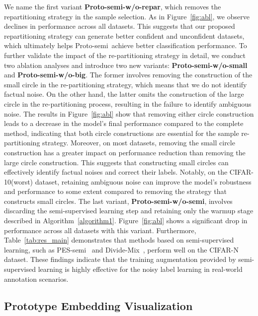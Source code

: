 \documentclass[letterpaper]{article} %
\newcommand{\method}{Proto-semi}
\begin{document}
We name the first variant \textbf{\method-w/o-repar}, which removes the repartitioning strategy in the sample selection. As in Figure~\ref{fig:abl}, we observe declines in performance across all datasets. This suggests that our proposed repartitioning strategy can generate better confident and unconfident datasets, which ultimately helps \method\ achieve better classification performance. To further validate the impact of the re-partitioning strategy in detail, we conduct two ablation analyses and introduce two new variants: \textbf{\method-w/o-small} and \textbf{\method-w/o-big}. The former involves removing the construction of the small circle in the re-partitioning strategy, which means that we do not identify factual noise. On the other hand, the latter omits the construction of the large circle in the re-partitioning process, resulting in the failure to identify ambiguous noise.
The results in Figure~\ref{fig:abl} show that removing either circle construction leads to a decrease in the model's final performance compared to the complete method, indicating that both circle constructions are essential for the sample re-partitioning strategy. Moreover, on most datasets, removing the small circle construction has a greater impact on performance reduction than removing the large circle construction. This suggests that constructing small circles can effectively identify factual noises and correct their labels. Notably, on the CIFAR-10(worst) dataset, retaining ambiguous noise can improve the model's robustness and performance to some extent compared to removing the strategy that constructs small circles. The last variant, \textbf{\method-w/o-semi}, involves discarding the semi-supervised learning step and retaining only the warmup stage described in Algorithm~\ref{algorithm1}. 
Figure~\ref{fig:abl} shows a significant drop in performance across all datasets with this variant.
Furthermore, Table~\ref{tab:res_main} demonstrates that methods based on semi-supervised learning, such as PES-semi~\cite{DBLP:conf/nips/BaiYHYLMNL21} and Divide-Mix~\cite{DBLP:conf/iclr/LiSH20}, perform well on the CIFAR-N dataset.
These findings indicate that the training augmentation provided by semi-supervised learning is highly effective for the noisy label learning in real-world annotation scenarios.




\subsection{Prototype Embedding Visualization}\label{sec:proto_visual}
\end{document}
